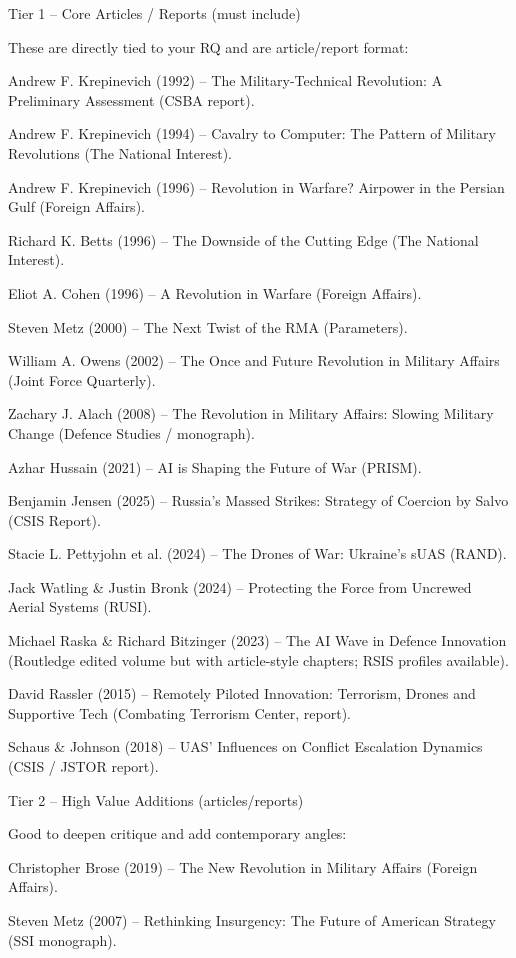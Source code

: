 Tier 1 – Core Articles / Reports (must include)

These are directly tied to your RQ and are article/report format:

Andrew F. Krepinevich (1992) – The Military-Technical Revolution: A Preliminary Assessment (CSBA report).

Andrew F. Krepinevich (1994) – Cavalry to Computer: The Pattern of Military Revolutions (The National Interest).

Andrew F. Krepinevich (1996) – Revolution in Warfare? Airpower in the Persian Gulf (Foreign Affairs).

Richard K. Betts (1996) – The Downside of the Cutting Edge (The National Interest).

Eliot A. Cohen (1996) – A Revolution in Warfare (Foreign Affairs).

Steven Metz (2000) – The Next Twist of the RMA (Parameters).

William A. Owens (2002) – The Once and Future Revolution in Military Affairs (Joint Force Quarterly).

Zachary J. Alach (2008) – The Revolution in Military Affairs: Slowing Military Change (Defence Studies / monograph).

Azhar Hussain (2021) – AI is Shaping the Future of War (PRISM).

Benjamin Jensen (2025) – Russia’s Massed Strikes: Strategy of Coercion by Salvo (CSIS Report).

Stacie L. Pettyjohn et al. (2024) – The Drones of War: Ukraine’s sUAS (RAND).

Jack Watling & Justin Bronk (2024) – Protecting the Force from Uncrewed Aerial Systems (RUSI).

Michael Raska & Richard Bitzinger (2023) – The AI Wave in Defence Innovation (Routledge edited volume but with article-style chapters; RSIS profiles available).

David Rassler (2015) – Remotely Piloted Innovation: Terrorism, Drones and Supportive Tech (Combating Terrorism Center, report).

Schaus & Johnson (2018) – UAS’ Influences on Conflict Escalation Dynamics (CSIS / JSTOR report).

Tier 2 – High Value Additions (articles/reports)

Good to deepen critique and add contemporary angles:

Christopher Brose (2019) – The New Revolution in Military Affairs (Foreign Affairs).

Steven Metz (2007) – Rethinking Insurgency: The Future of American Strategy (SSI monograph).

